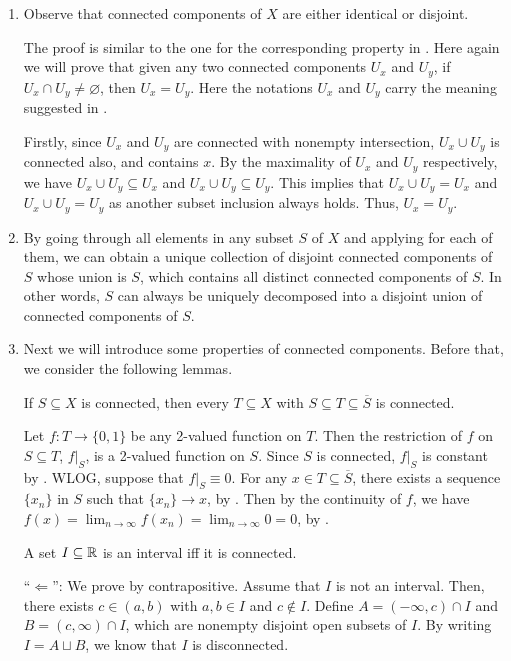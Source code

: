 \begin{enumerate}
\item \label{it:conn-compo-ident-or-disjoint}
Observe that connected components of \(X\) are either identical or disjoint.

\begin{pf}
The proof is similar to the one for the corresponding property in
. Here again we will prove that given any two
connected components \(U_x\) and \(U_y\), if \(U_x\cap U_y\ne\varnothing\),
then \(U_x=U_y\). Here the notations \(U_x\) and \(U_y\) carry the meaning
suggested in .

Firstly, since \(U_x\) and \(U_y\) are connected with nonempty intersection,
\(U_x\cup U_y\) is connected also, and contains \(x\).  By the maximality of
\(U_x\) and \(U_y\) respectively, we have \(U_x\cup U_y\subseteq U_x\) and
\(U_x\cup U_y\subseteq U_y\). This implies that \(U_x\cup U_y=U_x\) and
\(U_x\cup U_y=U_y\) as another subset inclusion always holds. Thus,
\(U_x=U_y\).
\end{pf}

\item \label{it:expr-disjoint-union-conn-compo} By going through all elements
in any subset \(S\) of \(X\) and applying  for each
of them, we can obtain a unique collection of disjoint connected components of
\(S\) whose union is \(S\), which contains all distinct connected components of
\(S\). In other words, \(S\) can always be uniquely decomposed into a disjoint
union of connected components of \(S\).

\item Next we will introduce some properties of connected components. Before
that, we consider the following lemmas.
\begin{lemma}
\label{lma:set-btw-s-clos-conn}
If \(S\subseteq X\) is connected, then every \(T\subseteq X\) with \(S\subseteq
T\subseteq \overline{S}\) is connected.
\end{lemma}
\begin{pf}
Let \(f:T\to\{0,1\}\) be any 2-valued function on \(T\). Then the restriction
of \(f\) on \(S\subseteq T\), \(f|_S\), is a 2-valued function on \(S\). Since
\(S\) is connected, \(f|_S\) is constant by . WLOG,
suppose that \(f|_S\equiv 0\). For any \(x\in T\subseteq \overline{S}\), there
exists a sequence \(\{x_n\}\) in \(S\) such that \(\{x_n\}\to x\), by
. Then by the continuity of \(f\), we have
\(f(x)=\lim_{n\to \infty}f(x_n)=\lim_{n\to \infty}0=0\), by
.
\end{pf}
\begin{lemma}
\label{lma:int-conn}
A set \(I\subseteq \mathbb{R}\) is an interval iff it is connected.
\end{lemma}
\begin{pf}
``\(\Leftarrow\)'': We prove by contrapositive. Assume that \(I\) is not an
interval. Then, there exists \(c\in (a,b)\) with \(a,b\in I\) and \(c\notin
I\). Define \(A=(-\infty,c)\cap I\) and \(B=(c,\infty)\cap I\), which are
nonempty disjoint open subsets of \(I\). By writing \(I=A\sqcup B\),
we know that \(I\) is disconnected.


\end{pf}
\end{enumerate}
